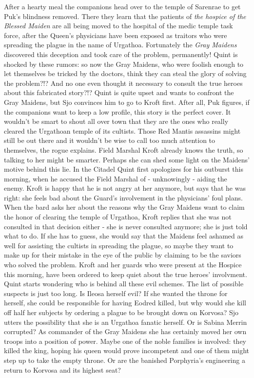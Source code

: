 After a hearty meal the companions head over to the temple of Sarenrae to get Puk's blindness removed. There they learn that the patients of {\itshape the hospice of the Blessed Maiden} are all being moved to the hospital of the medic temple task force, after the Queen's physicians have been exposed as traitors who were spreading the plague in the name of Urgathoa. Fortunately the  {\itshape Gray Maidens} discovered this deception and took care of the problem, permanently! Quint is shocked by these rumors: so now the Gray Maidens, who were foolish enough to let themselves be tricked by the doctors, think they can steal the glory of solving the problem?!? And no one even thought it necessary to consult the true heroes about this fabricated story?!? Quint is quite upset and wants to confront the Gray Maidens, but Sjo convinces him to go to Kroft first. After all, Puk figures, if the companions want to keep a low profile, this story is the perfect cover. It wouldn't be smart to shout all over town that they are the ones who really cleared the Urgathoan temple of its cultists. Those Red Mantis assassins might still be out there and it wouldn't be wise to call too much attention to themselves, the rogue explains. Field Marshal Kroft already knows the truth, so talking to her might be smarter. Perhaps she can shed some light on the Maidens' motive behind this lie. In the Citadel Quint first apologizes for his outburst this morning, when he accused the Field Marshal of - unknowingly - aiding the enemy. Kroft is happy that he is not angry at her anymore, but says that he was right: she feels bad about the Guard's involvement in the physicians' foul plans. When the bard asks her about the reasons why the Gray Maidens want to claim the honor of clearing the temple of Urgathoa, Kroft replies that she was not consulted in that decision either - she is never consulted anymore; she is just told what to do. If she has to guess, she would say that the Maidens feel ashamed as well for assisting the cultists in spreading the plague, so maybe they want to make up for their mistake in the eye of the public by claiming to be the saviors who solved the problem. Kroft and her guards who were present at the Hospice this morning, have been ordered to keep quiet about the true heroes' involvment.\\

Quint starts wondering who is behind all these evil schemes. The list of possible suspects is just too long. Is Ileosa herself evil? If she wanted the throne for herself, she could be responsible for having Eodred killed, but why would she kill off half her subjects by ordering a plague to be brought down on Korvosa? Sjo utters the possibility that she is an Urgathoa fanatic herself. Or is Sabina Merrin corrupted? As commander of the Gray Maidens she has certainly moved her own troops into a position of power. Maybe one of the noble families is involved: they killed the king, hoping his queen would prove incompetent and one of them might step up to take the empty throne. Or are the banished Porphyria's engineering a return to Korvosa and its highest seat?\\

